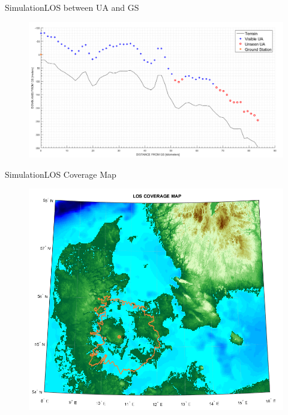 \begin{frame}{Simulation}{LOS between UA and GS} 
  	\begin{figure}
        \includegraphics[scale=0.29]{../report/figures/los_2points.png}
    \end{figure}
\end{frame}

\begin{frame}{Simulation}{LOS Coverage Map} 
  	\begin{figure}
        \includegraphics[scale=0.40]{../report/figures/los_odense.png}
    \end{figure}
\end{frame}

